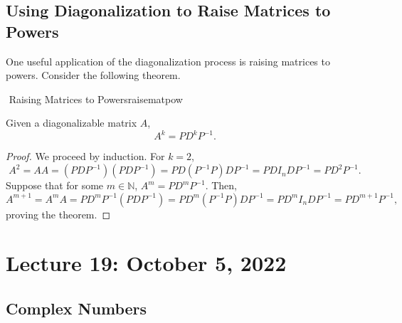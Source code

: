     \subsection{Using Diagonalization to Raise Matrices to Powers}

        One useful application of the diagonalization process is raising matrices to powers. Consider the following theorem.
        \begin{theorem}{\Stop\,\,Raising Matrices to Powers}{raisematpow}

            Given a diagonalizable matrix \(A\),
            \begin{equation*}
                A^k=PD^kP^{-1}.
            \end{equation*}
            \begin{proof}
                We proceed by induction. For \(k=2\),
                \begin{equation*}
                    A^2=AA=(PDP^{-1})(PDP^{-1})=PD(P^{-1}P)DP^{-1}=PDI_nDP^{-1}=PD^2P^{-1}.
                \end{equation*}
                Suppose that for some \(m\in\mathbb{N}\), \(A^m=PD^mP^{-1}\). Then,
                \begin{equation*}
                    A^{m+1}=A^mA=PD^mP^{-1}(PDP^{-1})=PD^m(P^{-1}P)DP^{-1}=PD^mI_nDP^{-1}=PD^{m+1}P^{-1},
                \end{equation*}
                proving the theorem.
            \end{proof}
            
        \end{theorem} 

\pagebreak

\section{Lecture 19: October 5, 2022}

    \subsection{Complex Numbers}

